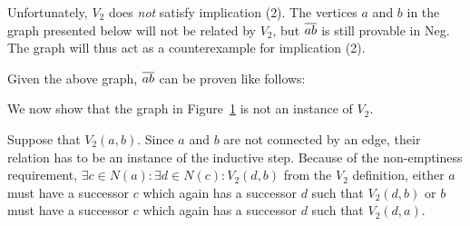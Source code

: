 Unfortunately, $V_2$ does \textit{not} satisfy implication (2).
The vertices $a$ and $b$ in the graph presented below will not be related by $V_2$, but $\ol{ab}$ is still provable in Neg.
The graph will thus act as a counterexample for implication (2).\par
\begin{figure}[!h]
  \centering
  \caption{}
  \label{fig:v2_counter_graph}
\end{figure}
\FloatBarrier
Given the above graph, $\ol{ab}$ can be proven like follows:\par
\begin{figure}[!h]
  \centering
  \begin{prooftree*}
  \end{prooftree*}
  \caption{}
  \label{fig:v2_counter_proof}
\end{figure}
We now show that the graph in Figure~\ref{fig:v2_counter_graph} is not an instance of $V_2$.

Suppose that $V_2(a,b)$.
Since $a$ and $b$ are not connected by an edge, their relation has to be an instance of the inductive step.
Because of the non-emptiness requirement, $\exists c \in N(a):\exists d \in N(c): V_2(d,b)$ from the $V_2$ definition, either $a$  must have a successor $c$ which again has a successor $d$ such that $V_2(d,b)$ or $b$ must have a successor $c$ which again has a successor $d$ such that $V_2(d,a)$.

